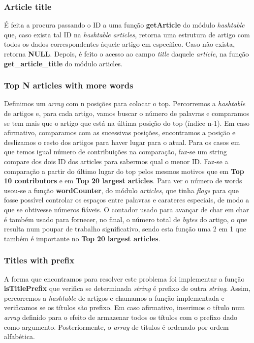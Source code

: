 \documentclass[a4paper]{article}
\begin{document}
\subsubsection{Article title}
É feita a procura passando o ID a uma função \textbf{getArticle} do módulo \textit{hashtable} que, caso exista tal ID na \textit{hashtable articles}, retorna uma estrutura de artigo com todos os dados correspondentes àquele artigo em específico. Caso não exista, retorna \textbf{NULL}. Depois, é feito o acesso ao campo \textit{title} daquele \textit{article}, na função \textbf{get\_article\_title} do módulo articles.

\subsubsection{Top N articles with more words}
Definimos um \textit{array} com n posições para colocar o top. Percorremos a \textit{hashtable} de artigos e, para cada artigo, vamos buscar o número de palavras e comparamos se tem mais que o artigo que está na última posição do top (índice n-1). Em caso afirmativo, comparamos com as sucessivas posições, encontramos a posição e deslizamos o resto dos artigos para haver lugar para o atual. Para os casos em que temos igual número de contribuições na comparação, faz-se um string compare dos dois ID dos articles para sabermos qual o menor ID.
Faz-se a comparação a partir do último lugar do top pelos mesmos motivos que em \textbf{Top 10 contributors} e em \textbf{Top 20 largest articles}.
Para ver o número de words usou-se a função \textbf{wordCounter}, do módulo \textit{articles}, que tinha \textit{flags} para que fosse possível controlar os espaços entre palavras e carateres especiais, de modo a que se obtivesse números fiáveis. O contador usado para avançar de char em char é também usado para fornecer, no final, o número total de \textit{bytes} do artigo, o que resulta num poupar de trabalho significativo, sendo esta função uma 2 em 1 que também é importante no \textbf{Top 20 largest articles}.

\subsubsection{Titles with prefix}
A forma que encontramos para resolver este problema foi implementar a função \textbf{isTitlePrefix} que verifica se determinada \textit{string} é prefixo de outra \textit{string}. Assim, percorremos a \textit{hashtable} de artigos e chamamos a função implementada e verificamos se os títulos são prefixo. Em caso afirmativo, inserimos o título num \textit{array} definido para o efeito de armazenar todos os títulos com o prefixo dado como argumento. Posteriormente, o \textit{array} de títulos é ordenado por ordem alfabética.
\end{document}
